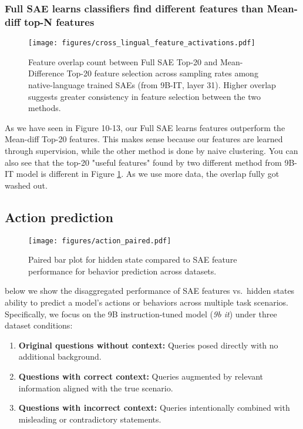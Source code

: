 \subsubsection{Full SAE learns classifiers find different features than Mean-diff top-N features}

\begin{figure}[ht]
    \centering
    \texttt{[image: figures/cross\_lingual\_feature\_activations.pdf]}
    \caption{Feature overlap count between Full SAE Top-20 and Mean-Difference Top-20 feature selection across sampling rates among native-language trained SAEs (from 9B-IT, layer 31). Higher overlap suggests greater consistency in feature selection between the two methods.}
    \label{fig:feature_overlap}
\end{figure}

As we have seen in Figure 10-13, our Full SAE learns features outperform the Mean-diff Top-20 features. This makes sense because our features are learned through supervision, while the other method is done by naive clustering. You can also see that the top-20 "useful features" found by two different method from 9B-IT model is different in Figure \ref{fig:feature_overlap}. As we use more data, the overlap fully got washed out.


\FloatBarrier

\subsection{Action prediction}
\label{app:action_paired_plot}

\begin{figure}
    \centering
    \texttt{[image: figures/action\_paired.pdf]}
    \caption{Paired bar plot for hidden state compared to SAE feature performance for behavior prediction across datasets.}
    \label{fig:action_paired}
\end{figure}

below we show the disaggregated performance of SAE features vs.\ hidden states ability to predict a model's actions or behaviors across multiple task scenarios. Specifically, we focus on the 9B instruction-tuned model (\emph{9b it}) under three dataset conditions:
\begin{enumerate}
    \item \textbf{Original questions without context:} Queries posed directly with no additional background.
    \item \textbf{Questions with correct context:} Queries augmented by relevant information aligned with the true scenario.
    \item \textbf{Questions with incorrect context:} Queries intentionally combined with misleading or contradictory statements.
\end{enumerate}

